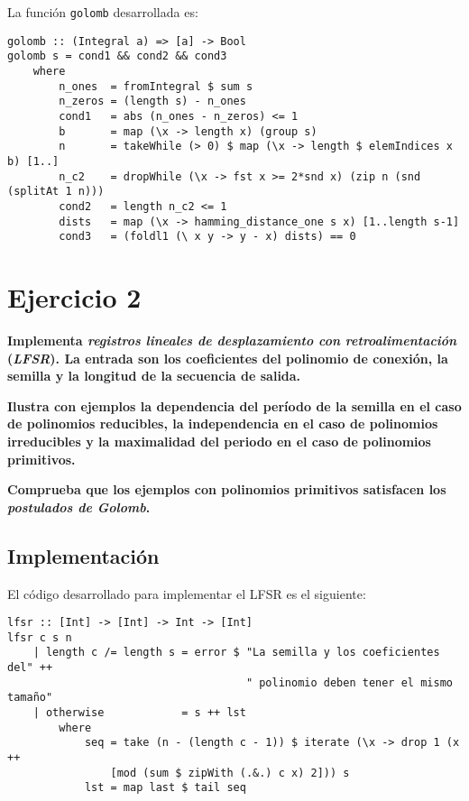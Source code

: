 \documentclass[10pt,spanish]{article}
\begin{document}
La función \texttt{golomb} desarrollada es:

\begin{verbatim}
golomb :: (Integral a) => [a] -> Bool
golomb s = cond1 && cond2 && cond3
    where
        n_ones  = fromIntegral $ sum s
        n_zeros = (length s) - n_ones
        cond1   = abs (n_ones - n_zeros) <= 1
        b       = map (\x -> length x) (group s)
        n       = takeWhile (> 0) $ map (\x -> length $ elemIndices x b) [1..]
        n_c2    = dropWhile (\x -> fst x >= 2*snd x) (zip n (snd (splitAt 1 n))) 
        cond2   = length n_c2 <= 1
        dists   = map (\x -> hamming_distance_one s x) [1..length s-1]
        cond3   = (foldl1 (\ x y -> y - x) dists) == 0
\end{verbatim}

\section{\textcolor{azul}Ejercicio 2}
\textbf{Implementa \textit{\textcolor{azul}{registros lineales de desplazamiento con retroalimentación}} (\textit{\textcolor{azul}{LFSR}}). La entrada son los coeficientes del polinomio de conexión, la semilla y la longitud de la secuencia de salida.}

\textbf{Ilustra con ejemplos la dependencia del período de la semilla en el caso de polinomios reducibles, la independencia en el caso de polinomios irreducibles y la maximalidad del periodo en el caso de polinomios primitivos.}

\textbf{Comprueba que los ejemplos con polinomios primitivos satisfacen los \textit{\textcolor{azul}{postulados de Golomb}}.}

\subsection{\textcolor{azul}Implementación}
El código desarrollado para implementar el LFSR es el siguiente:

\begin{verbatim}
lfsr :: [Int] -> [Int] -> Int -> [Int]
lfsr c s n
    | length c /= length s = error $ "La semilla y los coeficientes del" ++
                                     " polinomio deben tener el mismo tamaño"
    | otherwise            = s ++ lst
        where
            seq = take (n - (length c - 1)) $ iterate (\x -> drop 1 (x ++ 
                [mod (sum $ zipWith (.&.) c x) 2])) s
            lst = map last $ tail seq
\end{verbatim}
\end{document}
